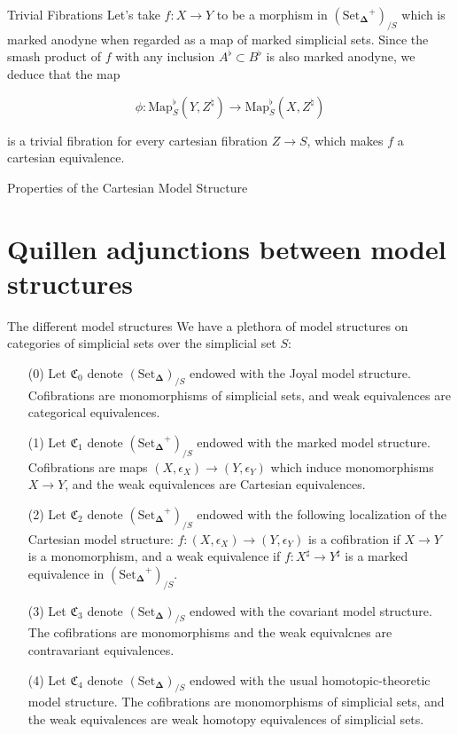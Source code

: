 \documentclass{beamer}[9pt]
\newcommand{\8}{\ensuremath{\infty}}
\newcommand{\C}{\ensuremath{\mathfrak{C}}}
\newcommand{\SSet}{\ensuremath{\text{Set}_{\boldsymbol{\Delta}}}}
\newcommand{\Map}{\ensuremath{\text{Map}}}
\begin{document}
\begin{frame}{Trivial Fibrations}
  Let's take $f: X \rightarrow Y$ to be a morphism in $(\SSet^+)_{/S}$ which is marked anodyne when regarded as a map of marked simplicial sets. Since the smash product of $f$ with any inclusion $A^\flat\subset B^\flat$ is also marked anodyne, we deduce that the map

  $$
    \phi: \Map_S^\flat(Y, Z^\natural) \rightarrow \Map_S^\flat(X, Z^\natural)
  $$

  is a trivial fibration for every cartesian fibration $Z \rightarrow S$, which makes $f$ a cartesian equivalence.
\end{frame}

\begin{frame}{Properties of the Cartesian Model Structure}
\end{frame}

\section{Quillen adjunctions between model structures}

\begin{frame}{The different model structures}
  We have a plethora of model structures on categories of simplicial sets over the simplicial set $S$:

  \begin{itemize}
    \item[(0)] Let $\C_0$ denote $(\SSet)_{/S}$ endowed with the Joyal model structure. Cofibrations are monomorphisms of simplicial sets, and weak equivalences are categorical equivalences.
    \item[(1)]  Let $\C_1$ denote $(\SSet^+)_{/S}$ endowed with the marked model structure. Cofibrations are maps $(X, \epsilon_X) \rightarrow (Y, \epsilon_Y)$ which induce monomorphisms $X \rightarrow Y$, and the weak equivalences are Cartesian equivalences.
  \end{itemize}
\end{frame}

\begin{frame}
  \begin{itemize}
    \item[(2)]  Let $\C_2$ denote $(\SSet^+)_{/S}$ endowed with the following localization of the Cartesian model structure: $f : (X, \epsilon_X) \rightarrow (Y, \epsilon_Y)$ is a cofibration if $X \rightarrow Y$ is a monomorphism, and a weak equivalence if $f : X^\sharp \rightarrow Y^\sharp$ is a marked equivalence in $(\SSet^+)_{/S}$.
    \item[(3)]  Let $\C_3$ denote $(\SSet)_{/S}$ endowed with the covariant model structure. The cofibrations are monomorphisms and the weak equivalcnes are contravariant equivalences.
    \item[(4)] Let $\C_4$ denote $(\SSet)_{/S}$ endowed with the usual homotopic-theoretic model structure. The cofibrations are monomorphisms of simplicial sets, and the weak equivalences are weak homotopy equivalences of simplicial sets.
  \end{itemize}
\end{frame}
\end{document}
